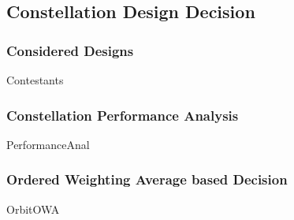 \subsection{Constellation Design Decision}

\subsubsection{Considered Designs}
{Contestants}

\subsubsection{Constellation Performance Analysis}
{PerformanceAnal}

\subsubsection{Ordered Weighting Average based Decision}
{OrbitOWA}